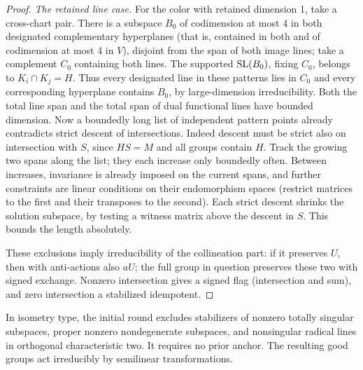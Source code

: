 \begin{proof}
\textit{The retained line case.} For the color with retained dimension 1, take a cross-chart pair. There is a subspace \(B_0\) of codimension at most 4 in both designated complementary hyperplanes (that is, contained in both and of codimension at most 4 in \(V\)), disjoint from the span of both image lines; take a complement \(C_0\) containing both lines. The supported \({\rm SL}(B_0)\), fixing \(C_0\), belongs to \(K_i\cap K_j=H\). Thus every designated line in these patterns lies in \(C_0\) and every corresponding hyperplane contains \(B_0\), by large-dimension irreducibility. Both the total line span and the total span of dual functional lines have bounded dimension. Now a boundedly long list of independent pattern points already contradicts strict descent of intersections. Indeed descent must be strict also on intersection with \(S\), since \(HS=M\) and all groups contain \(H\). Track the growing two spans along the list; they each increase only boundedly often. Between increases, invariance is already imposed on the current spans, and further constraints are linear conditions on their endomorphism spaces (restrict matrices to the first and their transposes to the second). Each strict descent shrinks the solution subspace, by testing a witness matrix above the descent in \(S\). This bounds the length absolutely.

These exclusions imply irreducibility of the collineation part: if it preserves \(U\), then with anti-actions also \(aU\); the full group in question preserves these two with signed exchange. Nonzero intersection gives a signed flag (intersection and sum), and zero intersection a stabilized idempotent.
\end{proof}

\begin{proposition}\label{c:isometry-subspaces}
In isometry type, the initial round excludes stabilizers of nonzero totally singular subspaces, proper nonzero nondegenerate subspaces, and nonsingular radical lines in orthogonal characteristic two. It requires no prior anchor. The resulting good groups act irreducibly by semilinear transformations.
\end{proposition}

